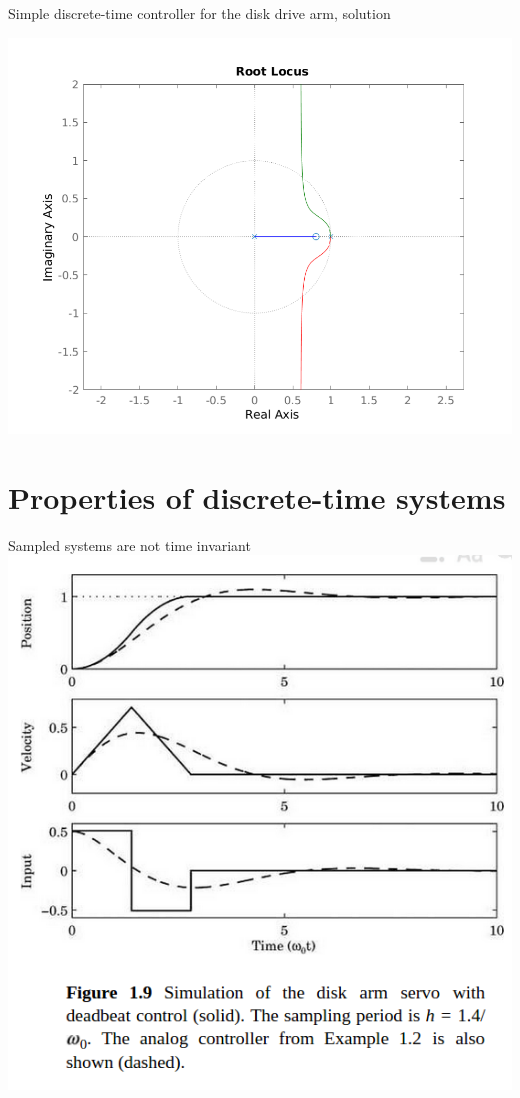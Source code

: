 \documentclass[presentation,aspectratio=1610]{beamer}
\begin{document}
\begin{frame}[label={sec:org4424cd9}]{Simple discrete-time controller for the disk drive arm, solution}
\begin{center}
\includegraphics[width=0.6\linewidth]{rlocus-disk-arm.discrete}
\end{center}
\end{frame}


\section{Properties of discrete-time systems}
\label{sec:orgcbfc37f}

\begin{frame}[label={sec:org6768baf}]{Sampled systems are \alert{not} time invariant}
\includegraphics[height=0.6\linewidth]{../../figures/fig1-9.png}
\end{frame}
\end{document}
